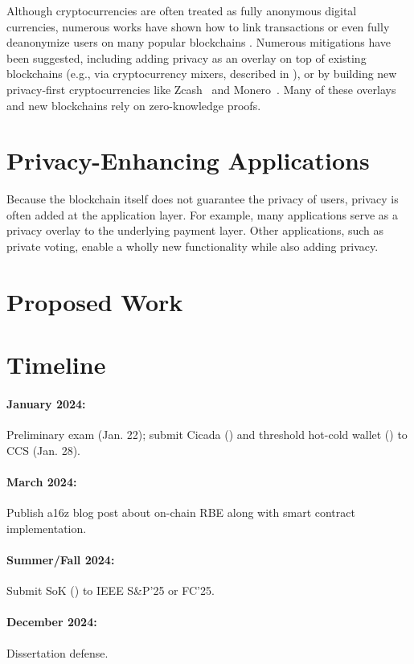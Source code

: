 \documentclass{article}
\begin{document}
Although cryptocurrencies are often treated as fully anonymous digital currencies, numerous works have shown how to link transactions or even fully deanonymize users on many popular blockchains \cite{CCS:BirKhoPus14,EuroSP:BirTik19,FC:KosKosMcD14,PoPETS:MSHLHSHHMNC18,USENIX:KYMM18}. Numerous mitigations have been suggested, including adding privacy as an overlay on top of existing blockchains (e.g., via cryptocurrency mixers, described in ), or by building new privacy-first cryptocurrencies like Zcash~\cite{zcash} and Monero~\cite{monero}. Many of these overlays and new blockchains rely on zero-knowledge proofs.



\section{Privacy-Enhancing Applications}\label{sec:applications}

Because the blockchain itself does not guarantee the privacy of users, privacy is often added at the application layer. For example, many applications serve as a privacy overlay to the underlying payment layer. Other applications, such as private voting, enable a wholly new functionality while also adding privacy.




\section{Proposed Work}\label{sec:proposed}



\section{Timeline}

\paragraph{January 2024:} Preliminary exam (Jan. 22); submit Cicada () and threshold hot-cold wallet () to CCS (Jan. 28).

\paragraph{March 2024:} Publish a16z blog post about on-chain RBE along with smart contract implementation.

\paragraph{Summer/Fall 2024:} Submit SoK () to IEEE S\&P'25 or FC'25.

\paragraph{December 2024:} Dissertation defense.

{\small


}
\end{document}

